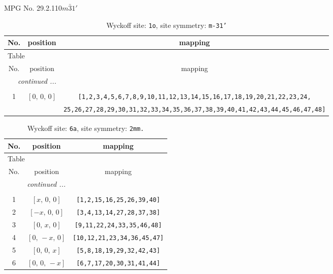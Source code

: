 \documentclass[fleqn,8pt]{jsarticle}
\begin{document}
\setcounter{MaxMatrixCols}{32}

\renewcommand{\tablename}{Table~}
\renewcommand{\figurename}{Figure~}
\begin{center}
\LARGE
MPG No. 29.2.110\quad$m\bar{3}1'$
\end{center}
\renewcommand{\arraystretch}{1.2}
\begin{longtable}{ccc}
\caption{Wyckoff site: {\tt 1o}, site symmetry: {\tt m-31'}}
 \\
 \hline \hline
No. & position & mapping \\ \hline \endfirsthead

\multicolumn{2}{l}{\tablename\ \thetable{}} \\
 \hline \hline
No. & position & mapping \\ \hline \endhead

 \hline \hline
\multicolumn{2}{r}{\footnotesize\it continued ...} \\ \endfoot

 \hline \hline
\multicolumn{2}{r}{} \\ \endlastfoot

1 & $\left[ 0,\, 0,\, 0 \right]$ & {\tt [1,2,3,4,5,6,7,8,9,10,11,12,13,14,15,16,17,18,19,20,21,22,23,24,} \\ \hline
 &  & {\tt 25,26,27,28,29,30,31,32,33,34,35,36,37,38,39,40,41,42,43,44,45,46,47,48]} \\
\end{longtable}
\renewcommand{\arraystretch}{1.2}
\begin{longtable}{ccc}
\caption{Wyckoff site: {\tt 6a}, site symmetry: {\tt 2mm.}}
 \\
 \hline \hline
No. & position & mapping \\ \hline \endfirsthead

\multicolumn{2}{l}{\tablename\ \thetable{}} \\
 \hline \hline
No. & position & mapping \\ \hline \endhead

 \hline \hline
\multicolumn{2}{r}{\footnotesize\it continued ...} \\ \endfoot

 \hline \hline
\multicolumn{2}{r}{} \\ \endlastfoot

1 & $\left[ x,\, 0,\, 0 \right]$ & {\tt [1,2,15,16,25,26,39,40]} \\ \hline
2 & $\left[ - x,\, 0,\, 0 \right]$ & {\tt [3,4,13,14,27,28,37,38]} \\ \hline
3 & $\left[ 0,\, x,\, 0 \right]$ & {\tt [9,11,22,24,33,35,46,48]} \\ \hline
4 & $\left[ 0,\, - x,\, 0 \right]$ & {\tt [10,12,21,23,34,36,45,47]} \\ \hline
5 & $\left[ 0,\, 0,\, x \right]$ & {\tt [5,8,18,19,29,32,42,43]} \\ \hline
6 & $\left[ 0,\, 0,\, - x \right]$ & {\tt [6,7,17,20,30,31,41,44]} \\
\end{longtable}
\end{document}
